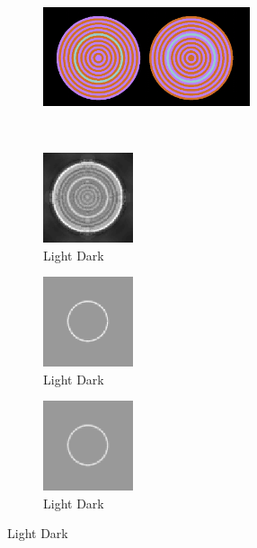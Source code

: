 \documentclass[journal,onecolumn]{IEEEtran}
\begin{document}
\begin{figure}[!htbp] \label{img:test-circle-neon-results}
    \centering
    \begin{subfigure}[b]{0.5\textwidth}
            \centering
            \includegraphics[width=230px]{test-circle-neon}
            \caption{}
            \label{img:test-circle-a}
    \end{subfigure}\\
    \begin{subfigure}[b]{0.25\textwidth}
            \centering
            \includegraphics[width=100px, frame]{test-circle-neon-dwt-a-ld}
            \caption{Light Dark}
            \label{img:test-circle-neon-dwt-a-ld}
    \end{subfigure}%
    \begin{subfigure}[b]{0.25\textwidth}
            \centering
            \includegraphics[width=100px, frame]{test-circle-neon-dwt-a-ld-mask}
            \caption{Light Dark}
            \label{img:test-circle-neon-dwt-a-ld-mask}
    \end{subfigure}%
    \begin{subfigure}[b]{0.25\textwidth}
            \centering
            \includegraphics[width=100px, frame]{test-circle-neon-dwt-b-ld-mask}
            \caption{Light Dark}
            \label{img:test-circle-neon-dwt-b-ld-mask}

\end{subfigure}
\end{figure}
\end{document}
